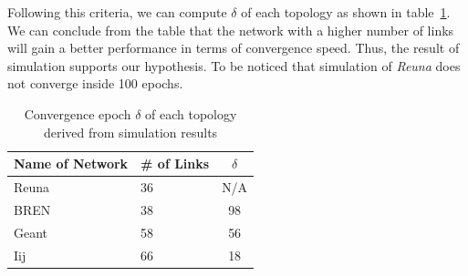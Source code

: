 Following this criteria, we can compute $\delta$ of each topology as shown in table~\ref{table:conv_epoch}. We can conclude from the table that the network with a higher number of links will gain a better performance in terms of convergence speed. Thus, the result of simulation supports our hypothesis. To be noticed that simulation of {\it Reuna} does not converge inside 100 epochs.
\begin{table}
\centering
\caption{Convergence epoch $\delta$ of each topology derived from simulation results}
\begin{tabular}{llc}
	\hline
	Name of Network &  \# of Links & $\delta$ \\
    	\hline
    	Reuna & 36 & N/A\\
    	BREN & 38 & 98\\
    	Geant & 58 & 56\\
    	Iij & 66 & 18\\
    	\hline
\end{tabular}
\label{table:conv_epoch}
\end{table}

